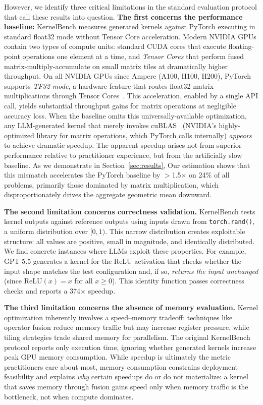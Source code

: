 \documentclass[]{fairmeta}
\begin{document}
However, we identify three critical limitations in the standard evaluation protocol that call these results into question.
\textbf{The first concerns the performance baseline: }KernelBench measures generated kernels against PyTorch executing in standard float32 mode without Tensor Core acceleration. Modern NVIDIA GPUs contain two types of compute units: standard CUDA cores that execute floating-point operations one element at a time, and \emph{Tensor Cores} that perform fused matrix-multiply-accumulate on small matrix tiles at dramatically higher throughput. On all NVIDIA GPUs since Ampere (A100, H100, H200), PyTorch supports \emph{TF32 mode}, a hardware feature that routes float32 matrix multiplications through Tensor Cores~\citep{tf32nvidia}. This acceleration, enabled by a single API call, yields substantial throughput gains for matrix operations at negligible accuracy loss. When the baseline omits this universally-available optimization, any LLM-generated kernel that merely invokes cuBLAS~\citep{DBLP:conf/ipps/AnztSTLYD14,DBLP:journals/tpds/KurzakAGD16} (NVIDIA's highly-optimized library for matrix operations, which PyTorch calls internally) \emph{appears} to achieve dramatic speedup. The apparent speedup arises not from superior performance relative to practitioner experience, but from the artificially slow baseline. As we demonstrate in Section~\ref{sec:results}, Our estimation shows that this mismatch accelerates the PyTorch baseline by $>$1.5$\times$ on 24\% of all problems, primarily those dominated by matrix multiplication, which disproportionately drives the aggregate geometric mean downward.

\textbf{The second limitation concerns correctness validation.} KernelBench tests kernel outputs against reference outputs using inputs drawn from \texttt{torch.rand()}, a uniform distribution over $[0, 1)$. This narrow distribution creates exploitable structure: all values are positive, small in magnitude, and identically distributed. We find concrete instances where LLMs exploit these properties. For example, GPT-5.5 generates a kernel for the ReLU activation that checks whether the input shape matches the test configuration and, if so, \emph{returns the input unchanged} (since $\text{ReLU}(x)=x$ for all $x \geq 0$). This identity function passes correctness checks and reports a 374$\times$ speedup.

\textbf{The third limitation concerns the absence of memory evaluation. }Kernel optimization inherently involves a speed--memory tradeoff: techniques like operator fusion reduce memory traffic but may increase register pressure, while tiling strategies trade shared memory for parallelism. The original KernelBench protocol reports only execution time, ignoring whether generated kernels increase peak GPU memory consumption. While speedup is ultimately the metric practitioners care about most, memory consumption constrains deployment feasibility and explains \emph{why} certain speedups do or do not materialize: a kernel that saves memory through fusion gains speed only when memory traffic is the bottleneck, not when compute dominates.
\end{document}
